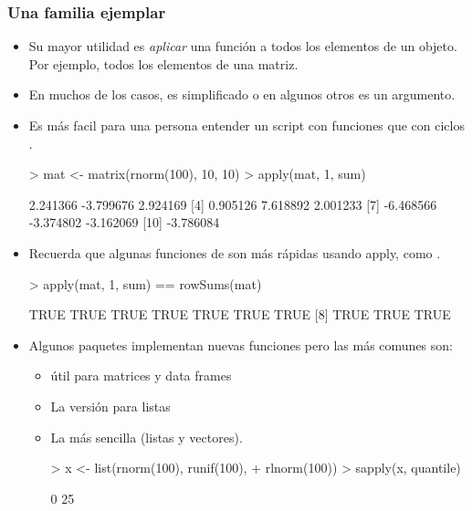 \begin{frame}
  \frametitle{Una familia ejemplar}
  \begin{itemize}
  \item Su mayor utilidad es \emph{aplicar} una funci\'on a todos los elementos de un objeto. Por ejemplo, todos los elementos de una matriz.
  \item En muchos de los casos, es simplificado o en algunos otros es un argumento.
  \item Es m\'as facil para una persona entender un script con funciones  que con ciclos .
\begin{Schunk}
\begin{Sinput}
> mat <- matrix(rnorm(100), 10, 10)
> apply(mat, 1, sum)
\end{Sinput}
\begin{Soutput}
 [1]  2.241366 -3.799676  2.924169
 [4]  0.905126  7.618892  2.001233
 [7] -6.468566 -3.374802 -3.162069
[10] -3.786084
\end{Soutput}
\end{Schunk}
  \item Recuerda que algunas funciones de  son m\'as r\'apidas usando apply, como .
\begin{Schunk}
\begin{Sinput}
> apply(mat, 1, sum) == rowSums(mat)
\end{Sinput}
\begin{Soutput}
 [1] TRUE TRUE TRUE TRUE TRUE TRUE TRUE
 [8] TRUE TRUE TRUE
\end{Soutput}
\end{Schunk}
  \item Algunos paquetes implementan nuevas funciones  pero las m\'as comunes son:
  \begin{itemize}
  \item {} \'util para matrices y data frames
  \item {} La versi\'on para listas
  \item {} La m\'as sencilla (listas y vectores).
\begin{Schunk}
\begin{Sinput}
> x <- list(rnorm(100), runif(100), 
+     rlnorm(100))
> sapply(x, quantile)
\end{Sinput}
\begin{Soutput}
            [,1]       [,2]       [,3]
0%
25%

\end{Soutput}
\end{Schunk}
\end{itemize}
\end{itemize}
\end{frame}
